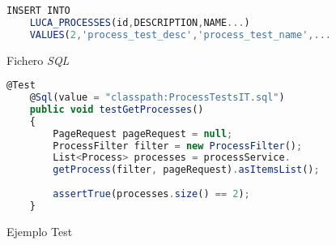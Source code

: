 \begin{figure}[!tb]
	\centering
	\begin{lstlisting}[language=Javascript]
	INSERT INTO 
	LUCA_PROCESSES(id,DESCRIPTION,NAME...)
	VALUES(2,'process_test_desc','process_test_name',...\end{lstlisting}
	\caption{Fichero \emph{SQL}}
	\label{fig:sqlFile}
\end{figure}
\begin{figure}[!tb]
	\centering
	\begin{lstlisting}[language=Javascript]
	@Test
	@Sql(value = "classpath:ProcessTestsIT.sql")
	public void testGetProcesses()
	{
		PageRequest pageRequest = null;
		ProcessFilter filter = new ProcessFilter();
		List<Process> processes = processService.
		getProcess(filter, pageRequest).asItemsList();
		
		assertTrue(processes.size() == 2);
	}\end{lstlisting}
	\caption{Ejemplo Test}
	\label{fig:testExample}
\end{figure}

